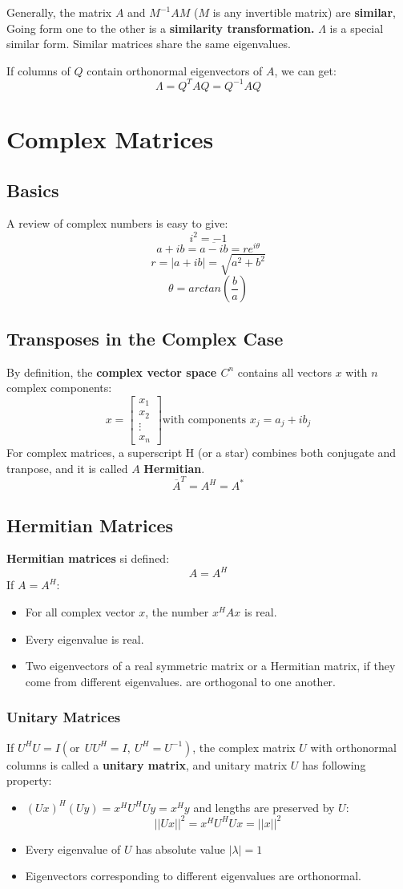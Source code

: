 \documentclass[10pt,a4paper,oneside]{article}
\begin{document}
Generally, the matrix $A$ and $M^{-1}AM$ ($M$ is any invertible matrix) are {\bfseries similar}, Going form one to the other is a {\bfseries similarity transformation.} $\Lambda$ is a special similar form. Similar matrices share the same eigenvalues. 


If columns of $Q$ contain orthonormal eigenvectors of $A$, we can get:
\[
\Lambda = Q^TAQ=Q^{-1}AQ
\]
\section{Complex Matrices}
\subsection{Basics}
A review of complex numbers is easy to give:
\[
i^2=-1
\]
\[
a+i b=\overline{a-i b}=r e^{i \theta}
\]
\[
r = |a+ib| = \sqrt{a^2+b^2}
\]
\[
\theta=arctan(\frac{b}{a})
\]
\subsection{Transposes in the Complex Case}
By definition, the {\bfseries complex vector space $C^n$} contains all vectors $x$ with $n$ complex components:
$$
x=\left[\begin{array}{c}{x_{1}} \\ {x_{2}} \\ {\vdots} \\ {x_{n}}\end{array}\right] \text{with components } x_j = a_j + ib_j
$$
For complex matrices, a superscript H (or a star) combines both conjugate and tranpose, and it is called $A$ {\bfseries Hermitian}.
\[
\overline{A}^T=A^H=A^*
\]
\subsection{Hermitian Matrices}
{\bfseries Hermitian matrices} si defined:
\[
A=A^H
\]
If $A=A^H$:
\begin{itemize}
\item For all complex vector $x$, the number $x^HAx$ is real.
\item Every eigenvalue is real.
\item Two eigenvectors of a real symmetric matrix or a Hermitian matrix, if they come from different eigenvalues. are orthogonal to one another.
\end{itemize}
\subsubsection{Unitary Matrices}
If $U^HU=I(\text{or}\ \ UU^H=I,\ U^H=U^{-1})$, the complex matrix $U$ with orthonormal columns is called a {\bfseries unitary matrix}, and unitary matrix $U$ has following property:
\begin{itemize}
\item $(Ux)^H(Uy)=x^HU^HUy=x^Hy$ and lengths are preserved by $U$:
\[
||Ux||^2=x^HU^HUx=||x||^2
\]
\item Every eigenvalue of $U$ has absolute value $|\lambda|=1$
\item Eigenvectors corresponding to different eigenvalues are orthonormal.
\end{itemize}
\end{document}
